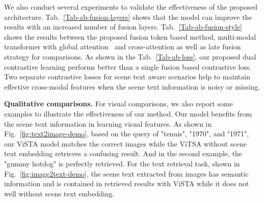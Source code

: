 \documentclass[10pt,twocolumn,letterpaper]{article}
\begin{document}
\begin{table}[thb]
\caption{Ablation study on the impact of loss functions.}\vspace{-0.5em}
\label{Tab-ab-loss}
\centering
\footnotesize
{}
\end{table} 

We also conduct several experiments to validate the effectiveness of the proposed architecture.
Tab.~\ref{Tab-ab-fusion-layers} shows that the model can improve the results with an increased number of fusion layers. Tab.~\ref{Tab-ab-fusion-style} shows the results between the proposed fusion token based method, multi-modal transformer with global attention~\cite{vl-betr} and cross-attention \cite{vilbert} as well as late fusion strategy for comparisons. As shown in the Tab.~\ref{Tab-ab-loss}, our proposed dual contrastive learning performs better than a single fusion based contrastive loss. Two separate contrastive losses for scene text aware scenarios help to maintain effective cross-modal features when the scene text information is noisy or missing. 



\noindent\textbf{Qualitative comparisons.} For visual comparisons, we also report some examples to illustrate the effectiveness of our method. Our model benefits from the scene text information in learning visual features. As shown in Fig.~\ref{fig:text2image-demo}, based on the query of "tennis", "1970", and "1971", our ViSTA model matches the correct images while the ViTSA without scene text embedding retrieves a confusing result. And in the second example, the "gummy hotdog" is perfectly retrieved. For the text retrieval task, shown in Fig.~\ref{fig:image2text-demo}, the scene text extracted from images has semantic information and is contained in retrieved results with ViSTA while it does not well without scene text embedding.
\end{document}
